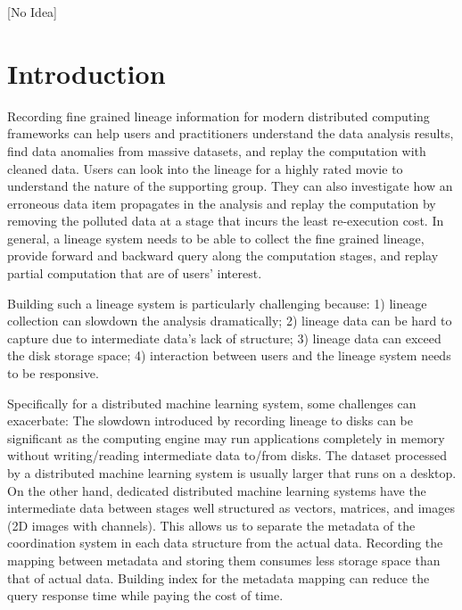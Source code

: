 \documentclass{sig-alternate}
\begin{document}
[No Idea]

\section{Introduction}
Recording fine grained lineage information for modern distributed computing frameworks can help
users and practitioners understand the data analysis results, find data anomalies from massive
datasets, and replay the computation with cleaned data. 
Users can look into the lineage for a highly rated movie to understand the nature of the supporting
group. They can also investigate how an erroneous data item propagates in the analysis and replay
the computation by removing the polluted data at a stage that incurs the least re-execution cost.
In general, a lineage system needs to be able to collect the fine grained lineage, 
provide forward and backward query along the computation stages, and replay partial computation
that are of users' interest.

Building such a lineage system is particularly challenging because: 
1) lineage collection can slowdown the analysis dramatically;
2) lineage data can be hard to capture due to intermediate data's lack of structure;
3) lineage data can exceed the disk storage space; 
4) interaction between users and the lineage system needs to be responsive.

Specifically for a distributed machine learning system, some challenges can exacerbate: 
The slowdown introduced by recording lineage to disks can be significant as the computing engine 
may run applications completely in memory without writing/reading intermediate data to/from disks. 
The dataset processed by a distributed machine learning system is usually larger that runs on a desktop.
On the other hand, dedicated distributed machine learning systems have the intermediate data between
stages well structured as vectors, matrices, and images (2D images with channels). 
This allows us to separate the metadata of the coordination system in each data structure from the actual data. 
Recording the mapping between metadata and storing them consumes less storage space than that of actual data.
Building index for the metadata mapping can reduce the query response time while paying the cost of time.
\end{document}
